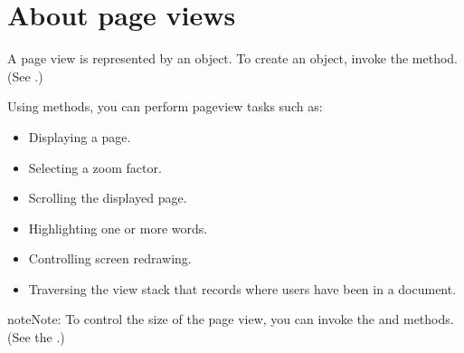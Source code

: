 \documentclass[letterpaper,12pt,english,openany,oneside]{sphinxmanual}
\begin{document}
\section{About page views}
\label{\detokenize{Plugins_Pages:about-page-views}}
A page view is represented by an  object. To create an  object, invoke the  method. (See .)

Using  methods, you can perform page\sphinxhyphen{}view tasks such as:
\begin{itemize}
\item {} 
Displaying a page.

\item {} 
Selecting a zoom factor.

\item {} 
Scrolling the displayed page.

\item {} 
Highlighting one or more words.

\item {} 
Controlling screen redrawing.

\item {} 
Traversing the view stack that records where users have been in a document.

\end{itemize}

\begin{sphinxadmonition}{note}{Note:}
To control the size of the page view, you can invoke the  and  methods. (See the .)
\end{sphinxadmonition}
\end{document}

